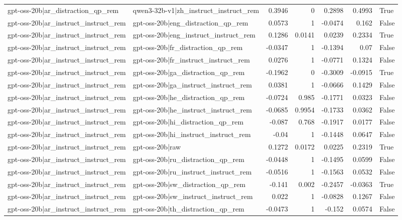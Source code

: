 \begin{table}
\begin{tabular}{l l r r r r l}
gpt-oss-20b|ar_distraction_qp_rem & qwen3-32b-v1|zh_instruct_instruct_rem & 0.3946 & 0 & 0.2898 & 0.4993 & True \\
gpt-oss-20b|ar_instruct_instruct_rem & gpt-oss-20b|eng_distraction_qp_rem & 0.0573 & 1 & -0.0474 & 0.162 & False \\
gpt-oss-20b|ar_instruct_instruct_rem & gpt-oss-20b|eng_instruct_instruct_rem & 0.1286 & 0.0141 & 0.0239 & 0.2334 & True \\
gpt-oss-20b|ar_instruct_instruct_rem & gpt-oss-20b|fr_distraction_qp_rem & -0.0347 & 1 & -0.1394 & 0.07 & False \\
gpt-oss-20b|ar_instruct_instruct_rem & gpt-oss-20b|fr_instruct_instruct_rem & 0.0276 & 1 & -0.0771 & 0.1324 & False \\
gpt-oss-20b|ar_instruct_instruct_rem & gpt-oss-20b|ga_distraction_qp_rem & -0.1962 & 0 & -0.3009 & -0.0915 & True \\
gpt-oss-20b|ar_instruct_instruct_rem & gpt-oss-20b|ga_instruct_instruct_rem & 0.0381 & 1 & -0.0666 & 0.1429 & False \\
gpt-oss-20b|ar_instruct_instruct_rem & gpt-oss-20b|he_distraction_qp_rem & -0.0724 & 0.985 & -0.1771 & 0.0323 & False \\
gpt-oss-20b|ar_instruct_instruct_rem & gpt-oss-20b|he_instruct_instruct_rem & -0.0685 & 0.9954 & -0.1733 & 0.0362 & False \\
gpt-oss-20b|ar_instruct_instruct_rem & gpt-oss-20b|hi_distraction_qp_rem & -0.087 & 0.768 & -0.1917 & 0.0177 & False \\
gpt-oss-20b|ar_instruct_instruct_rem & gpt-oss-20b|hi_instruct_instruct_rem & -0.04 & 1 & -0.1448 & 0.0647 & False \\
gpt-oss-20b|ar_instruct_instruct_rem & gpt-oss-20b|raw & 0.1272 & 0.0172 & 0.0225 & 0.2319 & True \\
gpt-oss-20b|ar_instruct_instruct_rem & gpt-oss-20b|ru_distraction_qp_rem & -0.0448 & 1 & -0.1495 & 0.0599 & False \\
gpt-oss-20b|ar_instruct_instruct_rem & gpt-oss-20b|ru_instruct_instruct_rem & -0.0516 & 1 & -0.1563 & 0.0532 & False \\
gpt-oss-20b|ar_instruct_instruct_rem & gpt-oss-20b|sw_distraction_qp_rem & -0.141 & 0.002 & -0.2457 & -0.0363 & True \\
gpt-oss-20b|ar_instruct_instruct_rem & gpt-oss-20b|sw_instruct_instruct_rem & 0.022 & 1 & -0.0828 & 0.1267 & False \\
gpt-oss-20b|ar_instruct_instruct_rem & gpt-oss-20b|th_distraction_qp_rem & -0.0473 & 1 & -0.152 & 0.0574 & False \\

\end{tabular}
\end{table}
